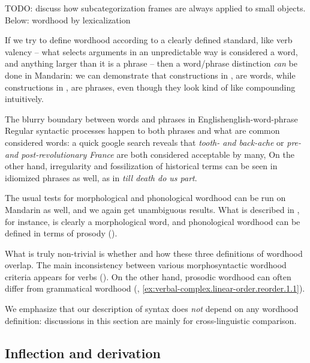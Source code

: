 \documentclass[UTF8, a4paper, oneside, scheme=plain, 12pt]{ctexrep}
\newcommand{\form}[1]{\emph{#1}}
\begin{document}
TODO: discuss how subcategorization frames are always applied to small objects.
Below: wordhood by lexicalization

If we try to define wordhood according to a clearly defined standard, like verb valency --
what selects arguments in an unpredictable way is considered a word,
and anything larger than it is a phrase --
then a word/phrase distinction \emph{can} be done in Mandarin:
we can demonstrate that constructions in ,
 are words,
while constructions in , 
are phrases, even though they look kind of like compounding intuitively.

\begin{theorybox}{The blurry boundary between words and phrases in English}{english-word-phrase}
    Regular syntactic processes happen to both phrases and what are common considered words:
    a quick google search reveals that \form{tooth- and back-ache}
    or \form{pre- and post-revolutionary France} are both considered acceptable by many,
    On the other hand, irregularity and fossilization of historical terms
    can be seen in idiomized phrases as well, as in \form{till death do us part}.
\end{theorybox}

The usual tests for morphological and phonological wordhood can be run on Mandarin as well,
and we again get unambiguous results.
What is described in ,
for instance, is clearly a morphological word,
and phonological wordhood can be defined in terms of prosody ().

What is truly non-trivial is whether and how these three definitions of wordhood overlap.
The main inconsistency between various morphosyntactic wordhood criteria appears for verbs
().
On the other hand, prosodic wordhood can often differ from grammatical wordhood 
(, \ref{ex:verbal-complex.linear-order.reorder.1.1}).

We emphasize that our description of syntax does \emph{not} depend on any wordhood definition:
discussions in this section are mainly for cross-linguistic comparison.

\subsection{Inflection and derivation}
\end{document}
